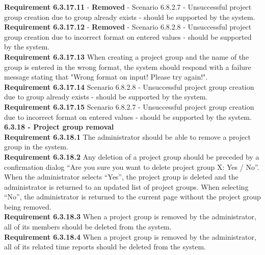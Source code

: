 \documentclass{article}
\begin{document}
\textbf{Requirement 6.3.17.11} - \textbf{Removed} - Scenario 6.8.2.7 - Unsuccessful project group creation due to group already exists - should be supported by the system. \\
\textbf{Requirement 6.3.17.12} - \textbf{Removed} - Scenario 6.8.2.8 - Unsuccessful project group creation due to incorrect format on entered values - should be supported by the system. \\
\textbf{Requirement 6.3.17.13} When creating a project group and the name of the group is entered in the wrong format, the system should respond with a failure message stating that "Wrong format on input! Please try again!". \\
\textbf{Requirement 6.3.17.14} Scenario 6.8.2.8 - Unsuccessful project group creation due to group already exists - should be supported by the system. \\
\textbf{Requirement 6.3.17.15}  Scenario 6.8.2.7 - Unsuccessful project group creation due to incorrect format on entered values - should be supported by the system. \\

{\fontsize{11}{11}\selectfont \noindent\textbf{6.3.18 - Project group removal}} \\
\textbf{Requirement 6.3.18.1} The administrator should be able to remove a project group in the system. \\
\textbf{Requirement 6.3.18.2} Any deletion of a project group should be preceded by a confirmation dialog “Are you sure you want to delete project group X: Yes / No”. When the administrator selects “Yes”, the project group is deleted and the administrator is returned to an updated list of project groups. When selecting “No”, the administrator is returned to the current page without the project group being removed. \\
\textbf{Requirement 6.3.18.3} When a project group is removed by the administrator, all of its members should be deleted from the system.  \\
\textbf{Requirement 6.3.18.4} When a project group is removed by the administrator, all of its related time reports should be deleted from the system.  \\
\end{document}

